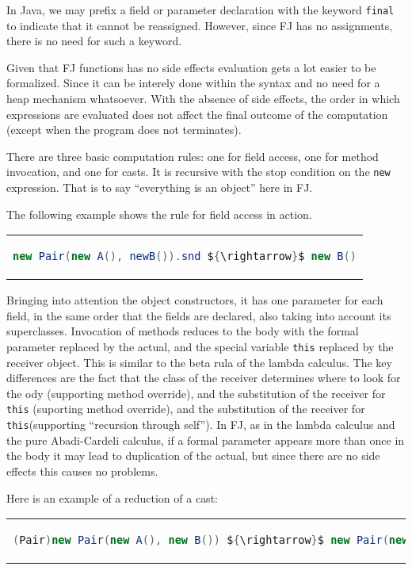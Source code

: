 In Java, we may prefix a field or parameter declaration with the keyword \texttt{final}
to indicate that it cannot be reassigned. However, since FJ has no assignments, there is
no need for such a keyword.

Given that FJ functions has no side effects evaluation gets a lot easier to be formalized.
Since it can be interely done within the syntax and no need for a heap mechanism whatsoever.
With the absence of side effects, the order in which expressions are evaluated does not affect
the final outcome of the computation (except when the program does not terminates).

There are three basic computation rules: one for field access, one for method
invocation, and one for casts.  It is recursive with the stop condition on the
\texttt{new} expression. That is to say ``everything is an object'' here in FJ.

The following example shows the rule for field access in action.

\begin{center}
\begin{tabular}{c}
\begin{lstlisting}[language=Java, mathescape = true]
    new Pair(new A(), newB()).snd ${\rightarrow}$ new B()
\end{lstlisting}
\end{tabular}
\end{center}

Bringing into attention the object constructors, it has one parameter for each
field, in the same order that the fields are declared, also taking into account
its superclasses.  Invocation of methods reduces to the body with the formal
parameter replaced by the actual, and the special variable \texttt{this}
replaced by the receiver object. This is similar to the beta rula of the lambda
calculus. The key differences are the fact that the class of the receiver
determines where to look for the ody (supporting method override), and the
substitution of the receiver for \texttt{this} (suporting method override), and
the substitution of the receiver for \texttt{this}(supporting ``recursion
through self''). In FJ, as in the lambda calculus and the pure Abadi-Cardeli
calculus, if a formal parameter appears more than once in the body it may lead
to duplication of the actual, but since there are no side effects this causes
no problems.

Here is an example of a reduction of a cast:
\begin{center}
\begin{tabular}{c}
\begin{lstlisting}[language=Java, mathescape = true]
(Pair)new Pair(new A(), new B()) ${\rightarrow}$ new Pair(new A(), new B())
\end{lstlisting}
\end{tabular}
\end{center}

